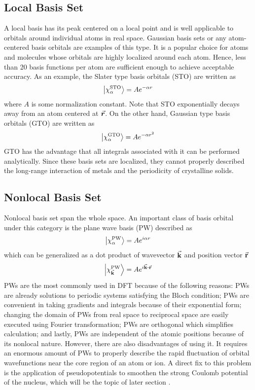 \subsection{Local Basis Set}
A local basis has its peak centered on a local point and is well applicable to orbitals around individual atoms in real space. Gaussian basis sets or any atom-centered basis orbitals are examples of this type. It is a popular choice for atoms and molecules whose orbitals are highly localized around each atom.
Hence, less than 20 basis functions per atom are sufficient enough to achieve acceptable accuracy. As an example, the Slater type basis orbitals (STO) are written as \citep{Slater1932}
\begin{equation}
	\ket{\chi^{\text{STO}}_\alpha} = A e^{-\alpha r}
\end{equation}
where $A$ is some normalization constant. Note that STO exponentially decays away from an atom centered at $\va*{r}$. On the other hand, Gaussian type basis orbitals (GTO)  are written as \citep{Boys1950}
\begin{equation}
	\ket{\chi^{\text{GTO}}_\alpha} = A e^{-\alpha r^2}
\end{equation}
GTO has the advantage that all integrals associated with it can be performed analytically. Since these basis sets are localized, they cannot properly described the long-range interaction of metals and the periodicity of crystalline solids.

\subsection{Nonlocal Basis Set}
Nonlocal basis set span the whole space. An important class of basis orbital under this category is the plane wave basis (PW) described as
\begin{equation}
	\ket{\chi^{\text{PW}}_\alpha} = A e^{i \alpha r}
\end{equation}
which can be generalized as a dot product of wavevector $\va{k}$ and position vector $\va{r}$
\begin{equation}
	\ket{\chi^{\text{PW}}_{\va{k}}} = A e^{i \va{k} \vdot \va{r}}
\end{equation}
PWs are the most commonly used in DFT  because of the following reasons: PWs are already solutions to periodic systems satisfying the Bloch condition; PWs are convenient  in taking gradients and integrals because of their exponential form; changing the domain of PWs from  real space to reciprocal space are easily executed using Fourier transformation; PWs are orthogonal which simplifies calculation; and lastly, PWs are independent of the atomic positions because of its nonlocal nature. However, there are also disadvantages of using it. It requires an enormous amount of PWs to properly describe the rapid fluctuation of orbital wavefunctions near the core region of an atom or ion. A direct fix to this problem is the application of pseudopotentials to smoothen the strong Coulomb potential of the nucleus, which will be the topic of later section \citep{Segall2002}.

